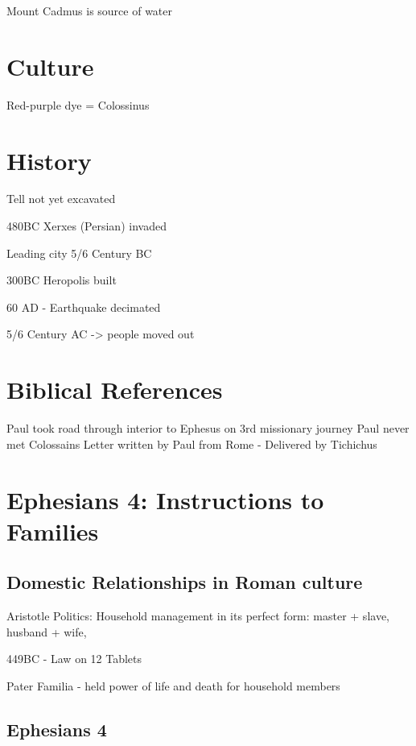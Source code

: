 \documentclass[
]{book}
\begin{document}
Mount Cadmus is source of water

\hypertarget{culture}{%
\section{Culture}\label{culture}}

Red-purple dye = Colossinus

\hypertarget{history-1}{%
\section{History}\label{history-1}}

Tell not yet excavated

480BC Xerxes (Persian) invaded

Leading city 5/6 Century BC

300BC Heropolis built

60 AD - Earthquake decimated

5/6 Century AC -\textgreater{} people moved out

\hypertarget{biblical-references}{%
\section{Biblical References}\label{biblical-references}}

Paul took road through interior to Ephesus on 3rd missionary journey
Paul never met Colossains
Letter written by Paul from Rome - Delivered by Tichichus

\hypertarget{ephesians-4-instructions-to-families}{%
\section{Ephesians 4: Instructions to Families}\label{ephesians-4-instructions-to-families}}

\hypertarget{domestic-relationships-in-roman-culture}{%
\subsection{Domestic Relationships in Roman culture}\label{domestic-relationships-in-roman-culture}}

Aristotle Politics: Household management in its perfect form: master + slave, husband + wife,

449BC - Law on 12 Tablets

Pater Familia - held power of life and death for household members

\hypertarget{ephesians-4}{%
\subsection{Ephesians 4}\label{ephesians-4}}
\end{document}

